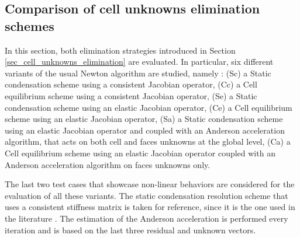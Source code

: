 \subsection{Comparison of cell unknowns elimination schemes}
\label{sec_num_example_part_2}

In this section, both elimination strategies
introduced in Section \ref{sec_cell_unknowns_elimination} are evaluated. In particular, six different variants of the usual
Newton algorithm
are studied, namely :
(Sc) a Static condensation scheme using a consistent Jacobian operator,
(Cc) a Cell equilibrium scheme using a consistent Jacobian operator,
(Se) a Static condensation scheme using an elastic Jacobian operator,
(Ce) a Cell equilibrium scheme using an elastic Jacobian operator,
(Sa) a Static condensation scheme using an elastic Jacobian operator and coupled with an Anderson acceleration algorithm, that acts on both cell and faces unknowns at the global level,
(Ca) a Cell equilibrium scheme using an elastic Jacobian operator coupled with an Anderson acceleration algorithm on faces unknowns only.

The last two test cases that showcase non-linear behaviors are considered for the evaluation of all these variants. The static condensation resolution scheme that uses a consistent stiffness matrix is taken for reference, since it is the
one used in the literature \cite{abbas_hybrid_2019,abbas_hybrid_2018}.
The estimation of the Anderson acceleration is performed every iteration and is based on the last three residual and unknown vectors.

